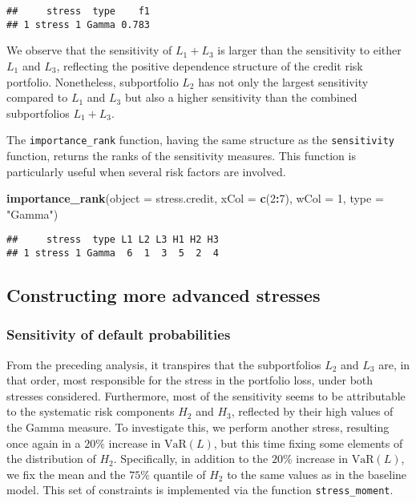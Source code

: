 \documentclass[
]{article}
\newenvironment{Shaded}{\begin{snugshade}}{\end{snugshade}}
\newcommand{\DataTypeTok}[1]{\textcolor[rgb]{0.13,0.29,0.53}{#1}}
\newcommand{\DecValTok}[1]{\textcolor[rgb]{0.00,0.00,0.81}{#1}}
\newcommand{\KeywordTok}[1]{\textcolor[rgb]{0.13,0.29,0.53}{\textbf{#1}}}
\newcommand{\NormalTok}[1]{#1}
\newcommand{\OperatorTok}[1]{\textcolor[rgb]{0.81,0.36,0.00}{\textbf{#1}}}
\newcommand{\StringTok}[1]{\textcolor[rgb]{0.31,0.60,0.02}{#1}}
\begin{document}
\begin{verbatim}
##     stress  type    f1
## 1 stress 1 Gamma 0.783
\end{verbatim}

We observe that the sensitivity of \(L_1 + L_3\) is larger than the sensitivity to either \(L_1\) and \(L_3\), reflecting the positive dependence structure of the credit risk portfolio. Nonetheless, subportfolio \(L_2\) has not only the largest sensitivity compared to \(L_1\) and \(L_3\) but also a higher sensitivity than the combined subportfolios \(L_1 + L_3\).

The \texttt{importance\_rank} function, having the same structure as the \texttt{sensitivity} function, returns the ranks of the sensitivity measures. This function is particularly useful when several risk factors are involved.

\begin{Shaded}
\begin{Highlighting}[]
\KeywordTok{importance_rank}\NormalTok{(}\DataTypeTok{object =}\NormalTok{ stress.credit, }\DataTypeTok{xCol =} \KeywordTok{c}\NormalTok{(}\DecValTok{2}\OperatorTok{:}\DecValTok{7}\NormalTok{), }\DataTypeTok{wCol =} \DecValTok{1}\NormalTok{, }\DataTypeTok{type =} \StringTok{"Gamma"}\NormalTok{)}
\end{Highlighting}
\end{Shaded}

\begin{verbatim}
##     stress  type L1 L2 L3 H1 H2 H3
## 1 stress 1 Gamma  6  1  3  5  2  4
\end{verbatim}

\hypertarget{constructing-more-advanced-stresses}{%
\subsection{Constructing more advanced stresses}\label{constructing-more-advanced-stresses}}

\hypertarget{sensitivity-of-default-probabilities}{%
\subsubsection{Sensitivity of default probabilities}\label{sensitivity-of-default-probabilities}}

From the preceding analysis, it transpires that the subportfolios \(L_2\) and \(L_3\) are, in that order, most responsible for the stress in the portfolio loss, under both stresses considered. Furthermore, most of the sensitivity seems to be attributable to the systematic risk components \(H_2\) and \(H_3\), reflected by their high values of the Gamma measure. To investigate this, we perform another stress, resulting once again in a \(20\%\) increase in \(\text{VaR}(L)\), but this time fixing some elements of the distribution of \(H_2\). Specifically, in addition to the \(20\%\) increase in \(\text{VaR}(L)\), we fix the mean and the \(75\%\) quantile of \(H_2\) to the same values as in the baseline model. This set of constraints is implemented via the function \texttt{stress\_moment}.
\end{document}
